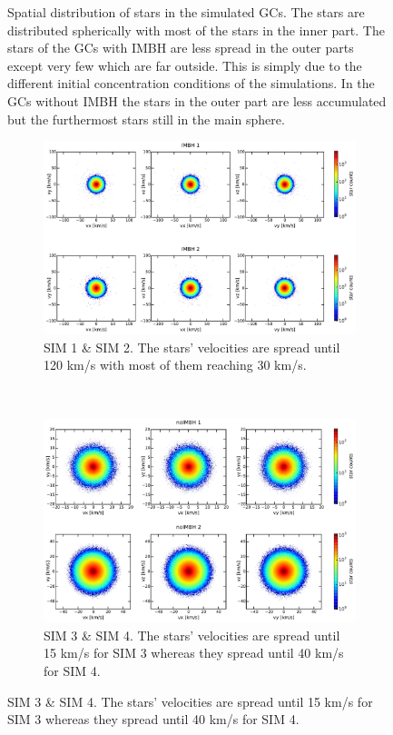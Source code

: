 \begin{figure}[htbp]
\caption{Spatial distribution of stars in the simulated \acp{GC}. The stars are distributed spherically with most of the stars in the inner part. The stars of the \acp{GC} with \ac{IMBH} are less spread in the outer parts except very few which are far outside. This is simply due to the different initial concentration conditions of the simulations. In the \acp{GC} without \ac{IMBH} the stars in the outer part are less accumulated but the furthermost stars still in the main sphere.}
\label{fig:position_scatter}
\end{figure}

\begin{figure}[htbp] 
\centering
	\begin{subfigure}{0.9\textwidth}
		\centering
	  	\includegraphics[width=\textwidth]{Plots/velocity_scatter_IMBH.pdf}
	  	\caption{SIM 1 \& SIM 2. The stars' velocities are spread until 120 km/s with most of them reaching 30 km/s.}
	 	\label{fig:vel_scat_IMBH}
	\end{subfigure}
	\\
	\begin{subfigure}{0.9\textwidth}
		\centering
	  	\includegraphics[width=\textwidth]{Plots/velocity_scatter_noIMBH.pdf}
	  	\caption{SIM 3 \& SIM 4. The stars' velocities are spread until 15 km/s for SIM 3 whereas they spread until 40 km/s for SIM 4.}
	 	\label{fig:vel_scat_noIMBH}
	\end{subfigure}


\end{figure}

